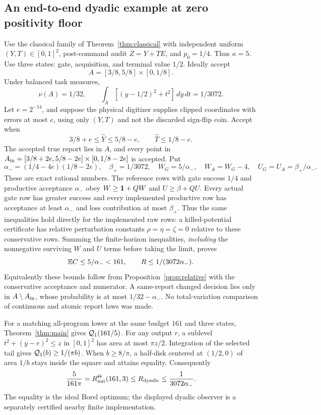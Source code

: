 \subsection*{An end-to-end dyadic example at zero positivity floor}
Use the classical family of Theorem~\ref{thm:classical} with independent uniform $(Y,T)\in[0,1]^2$, post-command audit $Z=Y+TE$, and $p_0=1/4$. Thus $\kappa=5$. Use three states: gate, acquisition, and terminal value $1/2$. Ideally accept
\[
 A=[3/8,5/8]\times[0,1/8].
\]
Under balanced task measures,
\begin{equation}\label{eq:dyadic-ideal}
 \nu(A)=1/32,\qquad
 \int_A[(y-1/2)^2+t^2]\,dy\,dt=1/3072.
\end{equation}
Let $e=2^{-14}$, and suppose the physical digitizer supplies clipped coordinates with errors at most $e$, using only $(Y,T)$ and not the discarded sign-flip coin. Accept when
\[
 3/8+e\le\widehat Y\le5/8-e,\qquad \widehat T\le1/8-e.
\]
The accepted true report lies in $A$, and every point in
$A_{\rm in}=[3/8+2e,5/8-2e]\times[0,1/8-2e]$ is accepted. Put
\begin{equation}\label{eq:dyadic-constants}
 \alpha_-=(1/4-4e)(1/8-2e),\quad
 \beta_+=1/3072,\quad
 W_G=5/\alpha_-,\quad W_A=W_G-4,\quad
 U_G=U_A=\beta_+/\alpha_-.
\end{equation}
These are exact rational numbers. The reference rows with gate success $1/4$ and productive acceptance $\alpha_-$ obey
$W\ge\mathbf1+QW$ and $U\ge\beta+QU$. Every actual gate row has greater success and every implemented productive row has acceptance at least $\alpha_-$ and loss contribution at most $\beta_+$. Thus the same inequalities hold directly for the implemented raw rows: a killed-potential certificate has relative perturbation constants $\rho=\eta=\zeta=0$ relative to these conservative rows. Summing the finite-horizon inequalities, \emph{including} the nonnegative surviving $W$ and $U$ terms before taking the limit, proves
\begin{equation}\label{eq:dyadic-final}
 \mathbb E C\le 5/\alpha_-<161,\qquad R\le1/(3072\alpha_-).
\end{equation}
Equivalently these bounds follow from Proposition~\ref{prop:relative} with the conservative acceptance and numerator. A same-report changed decision lies only in $A\setminus A_{\rm in}$, whose probability is at most $1/32-\alpha_-$. No total-variation comparison of continuous and atomic report laws was made.

For a matching all-program lower at the same budget $161$ and three states, Theorem~\ref{thm:main} gives $\mathcal Q_1(161/5)$. For any output $r$, a sublevel $t^2+(y-r)^2\le z$ in $[0,1]^2$ has area at most $\pi z/2$. Integration of the selected tail gives $\mathcal Q_1(b)\ge1/(\pi b)$. When $b\ge8/\pi$, a half-disk centered at $(1/2,0)$ of area $1/b$ stays inside the square and attains equality. Consequently
\begin{equation}\label{eq:dyadic-interval}
 \frac5{161\pi}=R_{\mathrm{aut}}^\Theta(161,3)
 \le R_{\rm dyadic}\le\frac1{3072\alpha_-}.
\end{equation}
The equality is the ideal Borel optimum; the displayed dyadic observer is a separately certified nearby finite implementation.

